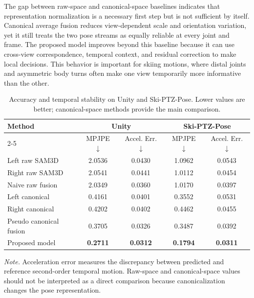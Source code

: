 \documentclass[sigconf,screen]{acmart}
\begin{document}
The gap between raw-space and canonical-space baselines indicates that representation normalization is a necessary first step but is not sufficient by itself. Canonical average fusion reduces view-dependent scale and orientation variation, yet it still treats the two pose streams as equally reliable at every joint and frame. The proposed model improves beyond this baseline because it can use cross-view correspondence, temporal context, and residual correction to make local decisions. This behavior is important for skiing motions, where distal joints and asymmetric body turns often make one view temporarily more informative than the other.

\begin{table}[t]
\centering
\caption{Accuracy and temporal stability on Unity and Ski-PTZ-Pose. Lower values are better; canonical-space methods provide the main comparison.}
\label{tab:accuracy_temporal_combined}
\setlength{\tabcolsep}{6pt}
\renewcommand{\arraystretch}{1.12}
\begin{tabular}{lcccc}
\hline
\multirow{2}{*}{Method} &
\multicolumn{2}{c}{Unity} &
\multicolumn{2}{c}{Ski-PTZ-Pose} \\
\cline{2-5}
& MPJPE \(\downarrow\) & Accel. Err. \(\downarrow\)
& MPJPE \(\downarrow\) & Accel. Err. \(\downarrow\) \\
\hline
Left raw SAM3D
& 2.0536 & 0.0430
& 1.0962 & 0.0543 \\

Right raw SAM3D
& 2.0541 & 0.0441
& 1.0112 & 0.0454 \\

Naive raw fusion
& 2.0349 & 0.0360
& 1.0170 & 0.0397 \\
\hline
Left canonical
& 0.4161 & 0.0401
& 0.3552 & 0.0531 \\

Right canonical
& 0.4202 & 0.0402
& 0.4462 & 0.0455 \\

Pseudo canonical fusion
& 0.3705 & 0.0326
& 0.3487 & 0.0392 \\

Proposed model
& \textbf{0.2711} & \textbf{0.0312}
& \textbf{0.1794} & \textbf{0.0311} \\
\hline
\end{tabular}
\vspace{0.5em}
\begin{minipage}{0.95\linewidth}
\footnotesize
\textit{Note.} Acceleration error measures the discrepancy between predicted and reference second-order temporal motion. Raw-space and canonical-space values should not be interpreted as a direct comparison because canonicalization changes the pose representation.
\end{minipage}

\end{table}
\end{document}
